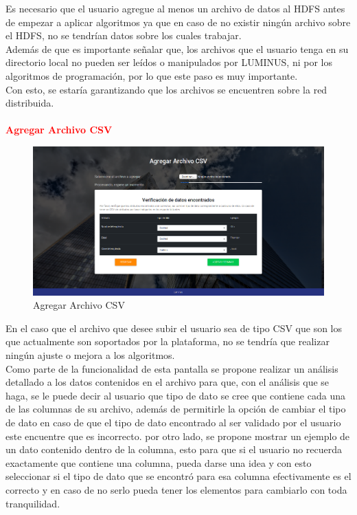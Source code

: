 Es necesario que el usuario agregue al menos un archivo de datos al HDFS antes de empezar a aplicar algoritmos ya que en caso de no existir ningún archivo sobre el HDFS, no se tendrían datos sobre los cuales trabajar.\\
Además de que es importante señalar que, los archivos que el usuario tenga en su directorio local no pueden ser leídos o manipulados por LUMINUS, ni por los algoritmos de programación, por lo que este paso es muy importante.\\
Con esto, se estaría garantizando que los archivos se encuentren sobre la red distribuida.\\
\\
\textbf{\textcolor{red}{Agregar Archivo CSV}}
\begin{figure}[H]
	\hypertarget{fig:red}{\hspace{1pt}}
	\begin{center}
		\includegraphics[width=1\textwidth]{capitulo7/images/archivoCSV.png}
		\caption{Agregar Archivo CSV}
		\label{fig:CSV}
	\end{center}
\end{figure}
En el caso que el archivo que desee subir el usuario sea de tipo CSV que son los que actualmente son soportados por la plataforma, no se tendría que realizar ningún ajuste o mejora a los algoritmos. \\
Como parte de la funcionalidad de esta pantalla se propone realizar un análisis detallado a los datos contenidos en el archivo para que, con el análisis que se haga, se le puede decir al usuario que tipo de dato se cree que contiene cada una de las columnas de su archivo, además de permitirle la opción de cambiar el tipo de dato en caso de que el tipo de dato encontrado al ser validado por el usuario este encuentre que es incorrecto. por otro lado, se propone mostrar un ejemplo de un dato contenido dentro de la columna, esto para que si el usuario no recuerda exactamente que contiene una columna, pueda darse una idea y con esto seleccionar si el tipo de dato que se encontró para esa columna efectivamente es el correcto y en caso de no serlo pueda tener los elementos para cambiarlo con toda tranquilidad.\\
